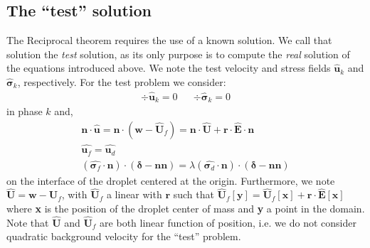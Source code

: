 \subsection{The ``test'' solution}

The Reciprocal theorem requires the use of a known solution.
We call that solution the \textit{test} solution, as its only purpose is to compute the \textit{real} solution of the equations introduced above. 
We note the test velocity and stress fields $\hat{\textbf{u}}_k$ and $\hat{\bm\sigma}_k$, respectively. 
For the test problem we consider:
\begin{align}
    \div \hat{\textbf{u}}_k = 0 
    && \div \hat{\bm\sigma}_k = 0 
    \label{eq:test_sol}
\end{align}
in phase $k$ and, 
\begin{align}    
    \textbf{n}\cdot \hat{\textbf{u}}=  \textbf{n}\cdot(\textbf{w} - \hat{\textbf{U}}_f) = \textbf{n}\cdot \hat{\textbf{U}} + \textbf{r}\cdot \hat{\textbf{E}} \cdot \textbf{n}\\
    \hat{\textbf{u}_f} = \hat{\textbf{u}_d}\\
    (\hat{\bm\sigma_f}\cdot \textbf{n}) \cdot (\bm\delta - \textbf{nn})
    = 
    \lambda (\hat{\bm\sigma_d}\cdot \textbf{n}) \cdot (\bm\delta - \textbf{nn}) \label{eq:bc_stress}
\end{align} 
on the interface of the droplet centered at the origin. 
Furthermore, we note $\hat{\textbf{U}} = \textbf{w} - \hat{\textbf{U}}_f$, with $\hat{\textbf{U}}_f$ a linear with $\textbf{r}$ such that $ \hat{\textbf{U}}_f[\textbf{y}] = \hat{\textbf{U}}_f[\textbf{x}]+\textbf{r}\cdot \hat{\textbf{E}}[\textbf{x}]$  where \textbf{x} is the position of the droplet center of mass and \textbf{y} a point in the domain.
Note that $\hat{\textbf{U}}$ and $\hat{\textbf{U}}_f$ are both linear function of position, i.e. we do not consider quadratic background velocity for the ``test''  problem. 

